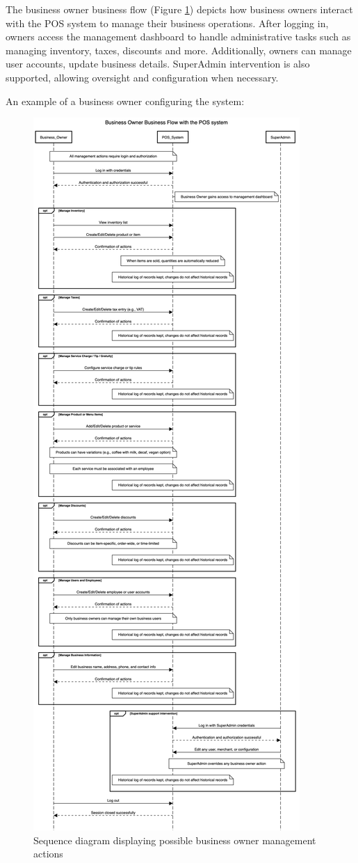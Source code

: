 \documentclass[11pt,a4paper,pdftex]{article}
\begin{document}
The business owner business flow (Figure \ref{figures:sequence_business_owner}) depicts how business owners interact with the POS system to manage their business operations. After logging in, owners access the management dashboard to handle administrative tasks such as managing inventory, taxes, discounts and more. Additionally, owners can manage user accounts, update business details. 
SuperAdmin intervention is also supported, allowing oversight and configuration when necessary. 

An example of a business owner configuring the system:

\begin{figure}[H]
    \centering
    \includegraphics[scale=0.22]{graphics/business owner.png}
    \caption{Sequence diagram displaying possible business owner management actions}
    \label{figures:sequence_business_owner}
\end{figure}
\end{document}
